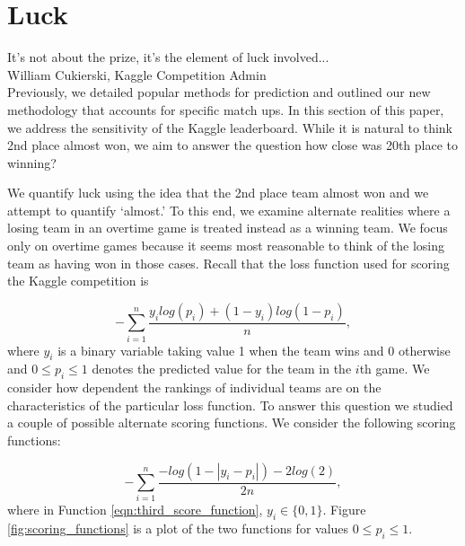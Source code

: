 
\section{Luck}
\noindent It's not about the prize, it's the element of luck involved...\\
\noindent  William Cukierski, Kaggle Competition Admin \\

Previously, we detailed popular methods for prediction and outlined our new methodology that accounts for specific match ups. In this section of this paper, we address the sensitivity of the Kaggle leaderboard. While it is natural to think 2nd place almost won, we aim to answer the question how close was 20th place to winning? 


We quantify luck using the idea that the 2nd place team almost won and we attempt to quantify `almost.' To this end, we examine alternate realities where a losing team in an overtime game is treated instead as a winning team. We focus only on overtime games because it seems most reasonable to think of the losing team as having won in those cases. Recall that the loss function used for scoring the Kaggle competition is


\begin{equation}\label{eqn:kaggle_score}
-\sum_{i=1}^n\frac{y_ilog(p_i)+ (1-y_i)log(1-p_i)}{n},
\end{equation}
where $y_i$ is a binary variable taking value 1 when the team wins and 0 otherwise and $0 \leq p_i \leq 1$ denotes the predicted value for the team in the $i$th game. We consider how dependent the rankings of individual teams are on the characteristics of the particular loss function. To answer this question we studied a couple of possible alternate scoring functions. We consider the following scoring functions: 
 


\begin{equation}\label{eqn:third_score_function}
  -\sum_{i=1}^n\frac{-log(1-|y_i-p_i|) - 2log(2)}{2n},
\end{equation} 
where in Function \ref{eqn:third_score_function}, $y_i \in \{0,1\}$. Figure \ref{fig:scoring_functions} is a plot of the two functions for values $0\leq p_i \leq 1$.  

